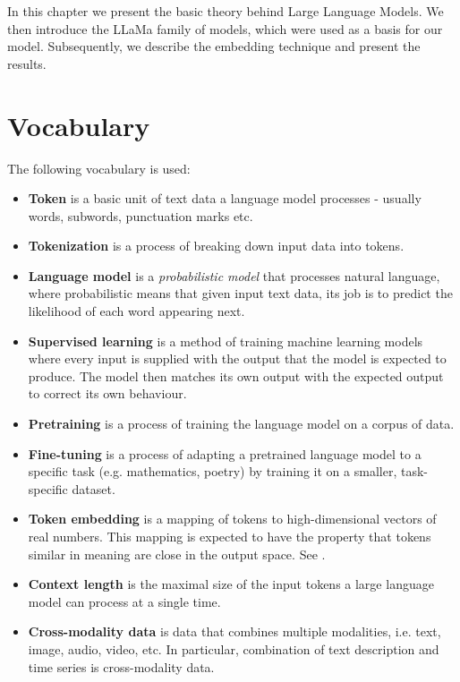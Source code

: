 In this chapter we present the basic theory behind Large Language Models. We then introduce the LLaMa family of models, which were used as a basis for our model. Subsequently, we describe the embedding technique and present the results.

\section{Vocabulary}

The following vocabulary is used:
\begin{itemize}
	\item \textbf{Token} is a basic unit of text data a language model processes - usually words, subwords, punctuation marks etc.

	\item \textbf{Tokenization} is a process of breaking down input data into tokens.

	\item \textbf{Language model} is a \textit{probabilistic model} that processes natural language, where probabilistic means that given input text data, its job is to predict the likelihood of each word appearing next. \cite{language_models}

	\item \textbf{Supervised learning} is a method of training machine learning models where every input is supplied with the output that the model is expected to produce. The model then matches its own output with the expected output to correct its own behaviour.

	\item \textbf{Pretraining} is a process of training the language model on a corpus of data.

	\item \textbf{Fine-tuning} is a process of adapting a pretrained language model to a specific task (e.g. mathematics, poetry) by training it on a smaller, task-specific dataset.

	\item \textbf{Token embedding} is a mapping of tokens to high-dimensional vectors of real numbers. This mapping is expected to have the property that tokens similar in meaning are close in the output space. See \cite{token_embeddings}.

	\item \textbf{Context length} is the maximal size of the input tokens a large language model can process at a single time.

	\item \textbf{Cross-modality data} is data that combines multiple modalities, i.e. text, image, audio, video, etc. In particular, combination of text description and time series is cross-modality data.

\end{itemize}

